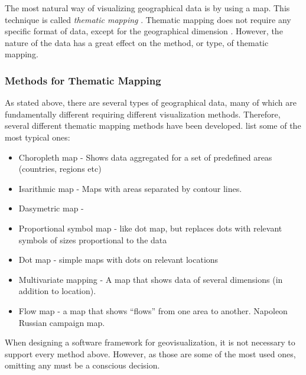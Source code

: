 The most natural way of visualizing geographical data is by using a map\citep[chap.~1]{kraak_cartography_2011}. This technique is called \emph{thematic mapping} \citep[chap.~1]{slocum_thematic_2014}. Thematic mapping does not require any specific format of data, except for the geographical dimension \citep[chap.~1]{kraak_cartography_2011}. However, the nature of the data has a great effect on the method, or type, of thematic mapping.

\subsubsection{Methods for Thematic Mapping}

As stated above, there are several types of geographical data, many of which are fundamentally different requiring different visualization methods. Therefore, several different thematic mapping methods have been developed. \citet[chap.~14-18]{slocum_thematic_2014} list some of the most typical ones: 

\begin{itemize}
	\item Choropleth map - Shows data aggregated for a set of predefined areas (countries, regions etc)
	\item Isarithmic map - Maps with areas separated by contour lines.
	\item Dasymetric map - 
	\item Proportional symbol map - like dot map, but replaces dots with relevant symbols of sizes proportional to the data
	\item Dot map - simple maps with dots on relevant locations
	\item Multivariate mapping - A map that shows data of several dimensions (in addition to location).
	\item Flow map - a map that shows ``flows'' from one area to another. Napoleon Russian campaign map.
\end{itemize}

When designing a software framework for geovisualization, it is not necessary to support every method above. However, as those are some of the most used ones, omitting any must be a conscious decision.



